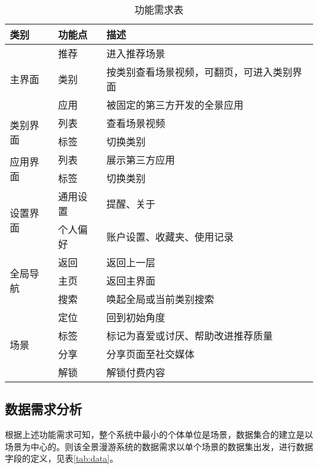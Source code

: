 \begin{table}[htp]
\centering
\caption{功能需求表}
\vskip 5pt
\begin{tabular}{lll}
\toprule
类别 & 功能点 & 描述 \\
\midrule
\multirow{3}{*}{主界面} & 推荐 & 进入推荐场景 \\
& 类别 & 按类别查看场景视频，可翻页，可进入类别界面 \\
& 应用 & 被固定的第三方开发的全景应用 \\
\midrule
\multirow{2}{*}{类别界面} & 列表 & 查看场景视频 \\
& 标签 & 切换类别 \\
\midrule
\multirow{2}{*}{应用界面} & 列表 & 展示第三方应用 \\
& 标签 & 切换类别 \\
\midrule
\multirow{2}{*}{设置界面} & 通用设置 & 提醒、关于 \\
& 个人偏好 & 账户设置、收藏夹、使用记录 \\
\midrule
\multirow{3}{*}{全局导航} & 返回 & 返回上一层 \\
& 主页 & 返回主界面 \\
& 搜索 & 唤起全局或当前类别搜索 \\
\midrule
\multirow{4}{*}{场景} & 定位 & 回到初始角度 \\
& 标签 & 标记为喜爱或讨厌、帮助改进推荐质量 \\
& 分享 & 分享页面至社交媒体 \\
& 解锁 & 解锁付费内容 \\
\bottomrule
\end{tabular}
\label{tab:func}
\end{table}

\subsection{数据需求分析}
根据上述功能需求可知，整个系统中最小的个体单位是场景，数据集合的建立是以场景为中心的。则该全景漫游系统的数据需求以单个场景的数据集出发，进行数据字段的定义，见表\ref{tab:data}。

